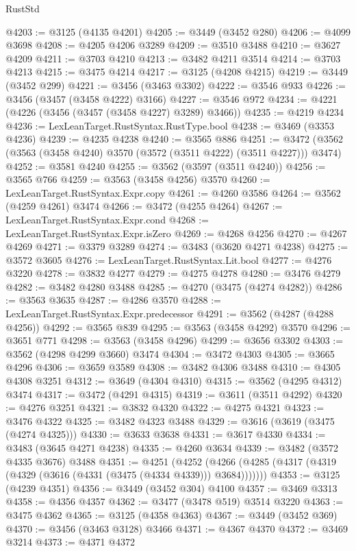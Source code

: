 \begin{lexlean}{RustStd}
\begin{coremodule}
@4203 := @3125 (@4135 @4201)
@4205 := @3449 (@3452 @280)
@4206 := @4099 @3698
@4208 := @4205 @4206 @3289
@4209 := @3510 @3488
@4210 := @3627 @4209
@4211 := @3703 @4210
@4213 := @3482 @4211 @3514
@4214 := @3703 @4213
@4215 := @3475 @4214
@4217 := @3125 (@4208 @4215)
@4219 := @3449 (@3452 @299)
@4221 := @3456 (@3463 @3302)
@4222 := @3546 @933
@4226 := @3456 (@3457 (@3458 @4222) @3166)
@4227 := @3546 @972
@4234 := @4221 (@4226 (@3456 (@3457 (@3458 @4227) @3289) @3466))
@4235 := @4219 @4234
@4236 := LexLeanTarget.RustSyntax.RustType.bool
@4238 := @3469 (@3353 @4236)
@4239 := @4235 @4238
@4240 := @3565 @886
@4251 := @3472 (@3562 (@3563 (@3458 @4240) @3570 (@3572 (@3511 @4222) (@3511 @4227))) @3474)
@4252 := @3581 @4240
@4255 := @3562 (@3597 (@3511 @4240))
@4256 := @3565 @766
@4259 := @3563 (@3458 @4256) @3570
@4260 := LexLeanTarget.RustSyntax.Expr.copy
@4261 := @4260 @3586
@4264 := @3562 (@4259 @4261) @3474
@4266 := @3472 (@4255 @4264)
@4267 := LexLeanTarget.RustSyntax.Expr.cond
@4268 := LexLeanTarget.RustSyntax.Expr.isZero
@4269 := @4268 @4256
@4270 := @4267 @4269
@4271 := @3379 @3289
@4274 := @3483 (@3620 @4271 @4238)
@4275 := @3572 @3605
@4276 := LexLeanTarget.RustSyntax.Lit.bool
@4277 := @4276 @3220
@4278 := @3832 @4277
@4279 := @4275 @4278
@4280 := @3476 @4279
@4282 := @3482 @4280 @3488
@4285 := @4270 (@3475 (@4274 @4282))
@4286 := @3563 @3635
@4287 := @4286 @3570
@4288 := LexLeanTarget.RustSyntax.Expr.predecessor
@4291 := @3562 (@4287 (@4288 @4256))
@4292 := @3565 @839
@4295 := @3563 (@3458 @4292) @3570
@4296 := @3651 @771
@4298 := @3563 (@3458 @4296)
@4299 := @3656 @3302
@4303 := @3562 (@4298 @4299 @3660) @3474
@4304 := @3472 @4303
@4305 := @3665 @4296
@4306 := @3659 @3589
@4308 := @3482 @4306 @3488
@4310 := @4305 @4308 @3251
@4312 := @3649 (@4304 @4310)
@4315 := @3562 (@4295 @4312) @3474
@4317 := @3472 (@4291 @4315)
@4319 := @3611 (@3511 @4292)
@4320 := @4276 @3251
@4321 := @3832 @4320
@4322 := @4275 @4321
@4323 := @3476 @4322
@4325 := @3482 @4323 @3488
@4329 := @3616 (@3619 (@3475 (@4274 @4325)))
@4330 := @3633 @3638
@4331 := @3617 @4330
@4334 := @3483 (@3645 @4271 @4238)
@4335 := @4260 @3634
@4339 := @3482 (@3572 @4335 @3676) @3488
@4351 := @4251
    (@4252 (@4266 (@4285 (@4317 (@4319 (@4329 (@3616 (@4331 (@3475 (@4334 @4339))) @3684)))))))
@4353 := @3125 (@4239 @4351)
@4356 := @3449 (@3452 @304) @4100
@4357 := @3469 @3313
@4358 := @4356 @4357
@4362 := @3477 (@3478 @519) @3514 @3220
@4363 := @3475 @4362
@4365 := @3125 (@4358 @4363)
@4367 := @3449 (@3452 @369)
@4370 := @3456 (@3463 @3128) @3466
@4371 := @4367 @4370
@4372 := @3469 @3214
@4373 := @4371 @4372

\end{coremodule}
\end{lexlean}
